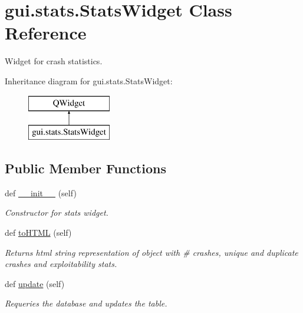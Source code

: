 \hypertarget{classgui_1_1stats_1_1_stats_widget}{}\section{gui.\+stats.\+Stats\+Widget Class Reference}
\label{classgui_1_1stats_1_1_stats_widget}


Widget for crash statistics.  


Inheritance diagram for gui.\+stats.\+Stats\+Widget\+:\begin{figure}[H]
\begin{center}
\leavevmode
\includegraphics[height=2.000000cm]{dd/da4/classgui_1_1stats_1_1_stats_widget}
\end{center}
\end{figure}
\subsection*{Public Member Functions}
\begin{DoxyCompactItemize}
\item 
\mbox{\label{classgui_1_1stats_1_1_stats_widget_ab4d59eb927e2fd020fcdc10190b0f14a}} 
def \mbox{\hyperlink{classgui_1_1stats_1_1_stats_widget_ab4d59eb927e2fd020fcdc10190b0f14a}{\+\_\+\+\_\+init\+\_\+\+\_\+}} (self)
\begin{DoxyCompactList}\small\item\em Constructor for stats widget. \end{DoxyCompactList}\item 
\mbox{\label{classgui_1_1stats_1_1_stats_widget_a0440210709134d6e4a08568aa0c50fdf}} 
def \mbox{\hyperlink{classgui_1_1stats_1_1_stats_widget_a0440210709134d6e4a08568aa0c50fdf}{to\+H\+T\+ML}} (self)
\begin{DoxyCompactList}\small\item\em Returns html string representation of object with \# crashes, unique and duplicate crashes and exploitability stats. \end{DoxyCompactList}\item 
\mbox{\label{classgui_1_1stats_1_1_stats_widget_ad749f965d9c5cd897a7fbdda0ec8882e}} 
def \mbox{\hyperlink{classgui_1_1stats_1_1_stats_widget_ad749f965d9c5cd897a7fbdda0ec8882e}{update}} (self)
\begin{DoxyCompactList}\small\item\em Requeries the database and updates the table. \end{DoxyCompactList}\end{DoxyCompactItemize}
